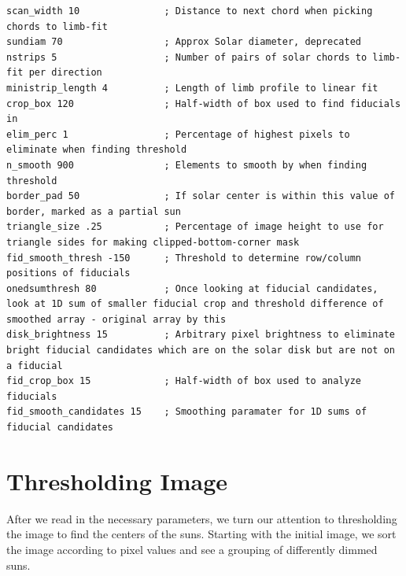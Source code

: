 \documentclass[10pt]{scrartcl}
\begin{document}
\begin{lstlisting}
scan_width 10               ; Distance to next chord when picking chords to limb-fit
sundiam 70                  ; Approx Solar diameter, deprecated
nstrips 5                   ; Number of pairs of solar chords to limb-fit per direction
ministrip_length 4          ; Length of limb profile to linear fit
crop_box 120                ; Half-width of box used to find fiducials in
elim_perc 1                 ; Percentage of highest pixels to eliminate when finding threshold
n_smooth 900                ; Elements to smooth by when finding threshold 
border_pad 50               ; If solar center is within this value of border, marked as a partial sun
triangle_size .25           ; Percentage of image height to use for triangle sides for making clipped-bottom-corner mask
fid_smooth_thresh -150      ; Threshold to determine row/column positions of fiducials
onedsumthresh 80            ; Once looking at fiducial candidates, look at 1D sum of smaller fiducial crop and threshold difference of smoothed array - original array by this
disk_brightness 15          ; Arbitrary pixel brightness to eliminate bright fiducial candidates which are on the solar disk but are not on a fiducial
fid_crop_box 15             ; Half-width of box used to analyze fiducials
fid_smooth_candidates 15    ; Smoothing paramater for 1D sums of fiducial candidates 

\end{lstlisting}

\section{Thresholding Image} %
\label{sec:thresholding_image}

After we read in the necessary parameters, we turn our attention to thresholding the image to find the centers of the suns. Starting with the initial image, we sort the image according to pixel values and see a grouping of differently dimmed suns. 
\end{document}

